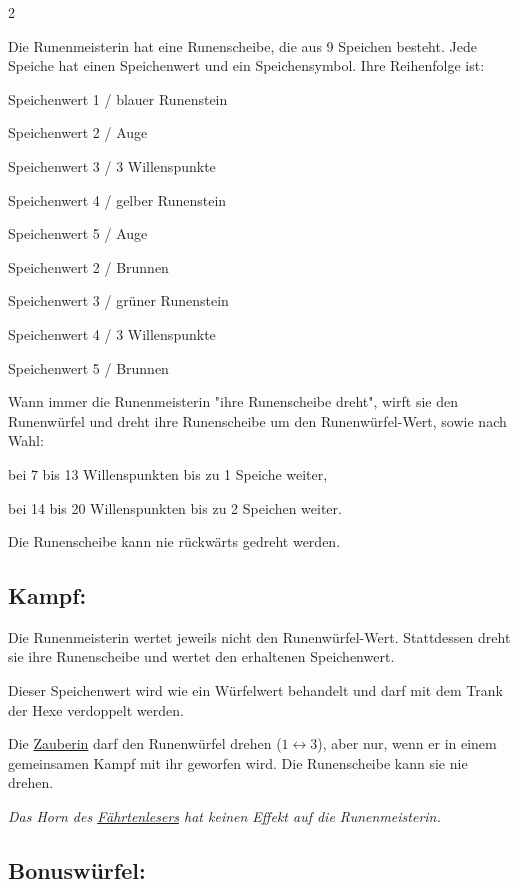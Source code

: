 \documentclass[10pt, a4paper, oneside]{book}
\newcommand{\fan}[1]{\textit{#1}}
\begin{document}
\begin{multicols*}{2}
\begin{nobgcolor}
Die Runenmeisterin hat eine Runenscheibe, die aus 9 Speichen besteht. Jede Speiche hat einen Speichenwert und ein Speichensymbol. Ihre Reihenfolge ist:

\bullet{} Speichenwert 1 / blauer Runenstein

\bullet{} Speichenwert 2 / Auge

\bullet{} Speichenwert 3 / 3 Willenspunkte

\bullet{} Speichenwert 4 / gelber Runenstein

\bullet{} Speichenwert 5 / Auge

\bullet{} Speichenwert 2 / Brunnen

\bullet{} Speichenwert 3 / grüner Runenstein

\bullet{} Speichenwert 4 / 3 Willenspunkte

\bullet{} Speichenwert 5 / Brunnen

Wann immer die Runenmeisterin "ihre Runenscheibe dreht", wirft sie den Runenwürfel und dreht ihre Runenscheibe um den Runenwürfel-Wert, sowie nach Wahl:

\bullet{} bei 7 bis 13 Willenspunkten bis zu\supercite{89598} 1 Speiche weiter,

\bullet{} bei 14 bis 20 Willenspunkten bis zu\supercite{89598} 2 Speichen weiter.

Die Runenscheibe kann nie rückwärts gedreht werden.
\supercite{mh-begleitheft}




\subsection{Kampf:}

Die Runenmeisterin wertet jeweils nicht den Runenwürfel-Wert. Stattdessen dreht sie ihre Runenscheibe und wertet den erhaltenen Speichenwert.

Dieser Speichenwert wird wie ein Würfelwert behandelt und darf mit dem Trank der Hexe verdoppelt werden.
\supercite{90045}

Die \hyperref[zauberin]{Zauberin} darf den Runenwürfel drehen\supercite{88563} ($1 \leftrightarrow 3$), aber nur, wenn er in einem gemeinsamen Kampf mit ihr geworfen wird. Die Runenscheibe kann sie nie drehen.

\fan{Das Horn des \hyperref[faehrtenleser]{Fährtenlesers} hat keinen Effekt auf die Runenmeisterin.}



\subsection{Bonuswürfel:}


\end{nobgcolor}
\end{multicols*}
\end{document}
